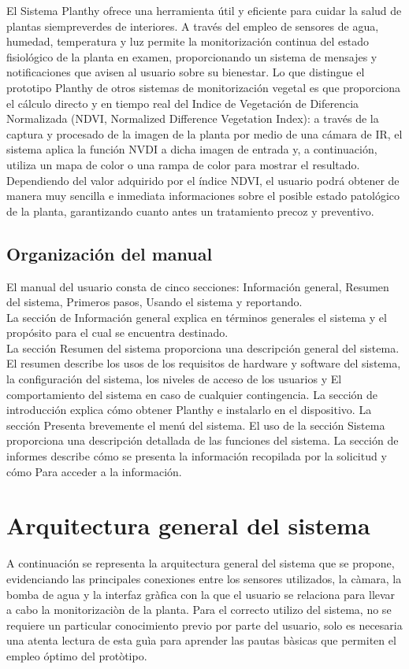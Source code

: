 \documentclass[12pt]{article}
\begin{document}
El Sistema Planthy ofrece una herramienta útil y eficiente para cuidar la salud de plantas siempreverdes de interiores.
A través del empleo de sensores de agua, humedad, temperatura y luz permite la monitorización continua del estado fisiológico de la planta en examen, proporcionando un sistema de mensajes y notificaciones que avisen al usuario sobre su bienestar. 
Lo que distingue el prototipo Planthy de otros sistemas de monitorización vegetal es que proporciona el cálculo directo y en tiempo real del Indice de Vegetación de Diferencia Normalizada (NDVI, Normalized Difference Vegetation Index): a través de la captura y procesado de la imagen de la planta por medio de una cámara de IR, el sistema aplica la función NVDI a dicha imagen de entrada y, a continuación, utiliza un mapa de color o una rampa de color para mostrar el resultado. Dependiendo del valor adquirido por el índice NDVI, el usuario podrá obtener de manera muy sencilla e inmediata informaciones sobre el posible estado patológico de la planta, garantizando cuanto antes un tratamiento precoz y preventivo.  



\subsection{Organización del manual}
El manual del usuario consta de cinco secciones: Información general, Resumen del sistema, Primeros pasos, Usando el sistema y reportando.
\\La sección de Información general explica en términos generales el sistema y el propósito para el cual se encuentra destinado.
\\La sección Resumen del sistema proporciona una descripción general del sistema. El resumen describe los usos de los requisitos de hardware y software del sistema, la configuración del sistema, los niveles de acceso de los usuarios y
El comportamiento del sistema en caso de cualquier contingencia.
La sección de introducción explica cómo obtener Planthy e instalarlo en el dispositivo. La sección
Presenta brevemente el menú del sistema.
El uso de la sección Sistema proporciona una descripción detallada de las funciones del sistema.
La sección de informes describe cómo se presenta la información recopilada por la solicitud y cómo
Para acceder a la información.

\newpage

\section{Arquitectura general del sistema}
A continuación se representa la arquitectura general del sistema que se propone, evidenciando las principales conexiones entre los sensores utilizados, la càmara, la bomba de agua y la interfaz gràfica con la que el usuario se relaciona para llevar a cabo la monitorizaciòn de la planta. Para el correcto utilizo del sistema, no se requiere un particular conocimiento previo por parte del usuario, solo es necesaria una atenta lectura de esta guìa para aprender las pautas bàsicas que permiten el empleo óptimo del protòtipo. 
\end{document}
